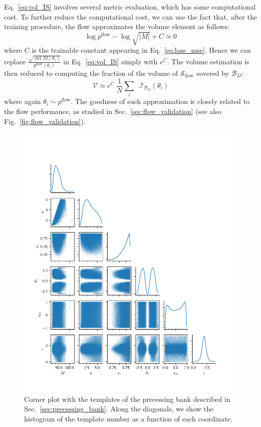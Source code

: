 \documentclass[twocolumn,showpacs,preprintnumbers,nofootinbib,prd,
superscriptaddress,10pt]{revtex4-2}
\begin{document}
Eq.~\eqref{eq:vol_IS} involves several metric evaluation, which has some computational cost.
To further reduce the computational cost, we can use the fact that, after the training procedure, the flow approximates the volume element as follows:
\begin{equation}
	\log p^\text{flow} - \log\sqrt{|M|} + C \simeq 0
\end{equation}
where $C$ is the trainable constant appearing in Eq.~\eqref{eq:loss_mse}.
Hence we can replace $\frac{\sqrt{\det M(\theta_i)}}{p^\text{flow}(\theta_i)}$ in Eq.~\eqref{eq:vol_IS} simply with $e^C$.
The volume estimation is then reduced to computing the fraction of the volume of $\mathcal{S}_\text{flow}$ covered by $\mathcal{B}_D$:
\begin{equation}
	\mathcal{V} \simeq e^C \; \frac{1}{N}  \sum_i \; \; \mathcal{I}_{\mathcal{B}_D}(\theta_i)
\end{equation}
where again $\theta_i \sim p^\text{flow}$.
The goodness of such approximation is closely related to the flow performance, as studied in Sec.~\ref{sec:flow_validation} (see also Fig.~\ref{fig:flow_validation}).

\begin{figure}
	\centering
	\includegraphics[scale = 1.]{corner_precessing}
	\caption{Corner plot with the templates of the precessing bank described in Sec.~\ref{sec:precessing_bank}. Along the diagonals, we show the histogram of the template number as a function of each coordinate.}
	\label{fig:corner_precessing}
\end{figure}
\end{document}
